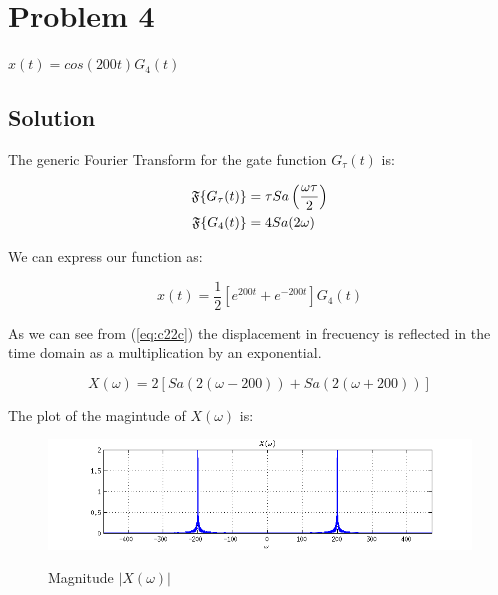 \section*{Problem 4}

$x(t) = cos(200t)G_4(t)$

\subsection*{Solution}

The generic Fourier Transform for the gate function $G_\tau(t)$ is:

\begin{align}
\mathfrak{F}\{ G_\tau(t)\} &= \tau Sa\left(\frac{\omega \tau}{2}\right) \label{eq:c2p4} \\
\mathfrak{F}\{ G_4(t)\} &= 4 Sa(2 \omega) \notag
\end{align}

We can express our function as:

\begin{equation*}
x(t) = \frac{1}{2} [e^{200 t} + e^{-200 t}] G_4(t)
\end{equation*} 

As we can see from (\ref{eq:c22c}) the displacement in frecuency is reflected in the
time domain as a multiplication by an exponential. 

\begin{equation*}
X(\omega) = 2 [ Sa(2(\omega - 200)) + Sa(2(\omega + 200))]
\end{equation*} 

The plot of the magintude of $X(\omega)$ is:

\begin{figure}[H]
\caption{Magnitude $|X(\omega)|$}
\centering
\includegraphics[width=1.0\textwidth]{figs/c2p4a.png}
\label{fig:c2p2a}
\end{figure} 

